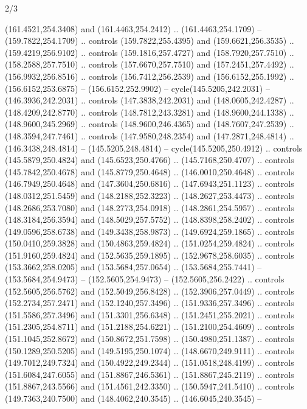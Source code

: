 \begin{flagdescription}{2/3}
\begin{scope}[xshift=0.5\flaglength,yshift=0.5\flagwidth,scale=\flagwidth/235.81]
\begin{scope}[y=0.8pt, x=0.8pt, yscale=-1,shift={(-239.08,-147.38)}]
    (161.4521,254.3408) and (161.4463,254.2412) .. (161.4463,254.1709) --
    (159.7822,254.1709) .. controls (159.7822,255.4395) and (159.6621,256.3535) ..
    (159.4219,256.9102) .. controls (159.1816,257.4727) and (158.7920,257.7510) ..
    (158.2588,257.7510) .. controls (157.6670,257.7510) and (157.2451,257.4492) ..
    (156.9932,256.8516) .. controls (156.7412,256.2539) and (156.6152,255.1992) ..
    (156.6152,253.6875) -- (156.6152,252.9902) -- cycle(145.5205,242.2031) --
    (146.3936,242.2031) .. controls (147.3838,242.2031) and (148.0605,242.4287) ..
    (148.4209,242.8770) .. controls (148.7812,243.3281) and (148.9600,244.1338) ..
    (148.9600,245.2969) .. controls (148.9600,246.4365) and (148.7607,247.2539) ..
    (148.3594,247.7461) .. controls (147.9580,248.2354) and (147.2871,248.4814) ..
    (146.3438,248.4814) -- (145.5205,248.4814) -- cycle(145.5205,250.4912) ..
    controls (145.5879,250.4824) and (145.6523,250.4766) .. (145.7168,250.4707) ..
    controls (145.7842,250.4678) and (145.8779,250.4648) .. (146.0010,250.4648) ..
    controls (146.7949,250.4648) and (147.3604,250.6816) .. (147.6943,251.1123) ..
    controls (148.0312,251.5459) and (148.2188,252.3223) .. (148.2627,253.4473) ..
    controls (148.2686,253.7080) and (148.2773,254.0918) .. (148.2861,254.5957) ..
    controls (148.3184,256.3594) and (148.5029,257.5752) .. (148.8398,258.2402) ..
    controls (149.0596,258.6738) and (149.3438,258.9873) .. (149.6924,259.1865) ..
    controls (150.0410,259.3828) and (150.4863,259.4824) .. (151.0254,259.4824) ..
    controls (151.9160,259.4824) and (152.5635,259.1895) .. (152.9678,258.6035) ..
    controls (153.3662,258.0205) and (153.5684,257.0654) .. (153.5684,255.7441) --
    (153.5684,254.9473) -- (152.5605,254.9473) -- (152.5605,256.2422) .. controls
    (152.5605,256.5762) and (152.5049,256.8428) .. (152.3906,257.0449) .. controls
    (152.2734,257.2471) and (152.1240,257.3496) .. (151.9336,257.3496) .. controls
    (151.5586,257.3496) and (151.3301,256.6348) .. (151.2451,255.2021) .. controls
    (151.2305,254.8711) and (151.2188,254.6221) .. (151.2100,254.4609) .. controls
    (151.1045,252.8672) and (150.8672,251.7598) .. (150.4980,251.1387) .. controls
    (150.1289,250.5205) and (149.5195,250.1074) .. (148.6670,249.9111) .. controls
    (149.7012,249.7324) and (150.4922,249.2344) .. (151.0518,248.4199) .. controls
    (151.6084,247.6055) and (151.8867,246.5361) .. (151.8867,245.2119) .. controls
    (151.8867,243.5566) and (151.4561,242.3350) .. (150.5947,241.5410) .. controls
    (149.7363,240.7500) and (148.4062,240.3545) .. (146.6045,240.3545) --

\end{scope}
\end{scope}
\end{flagdescription}
